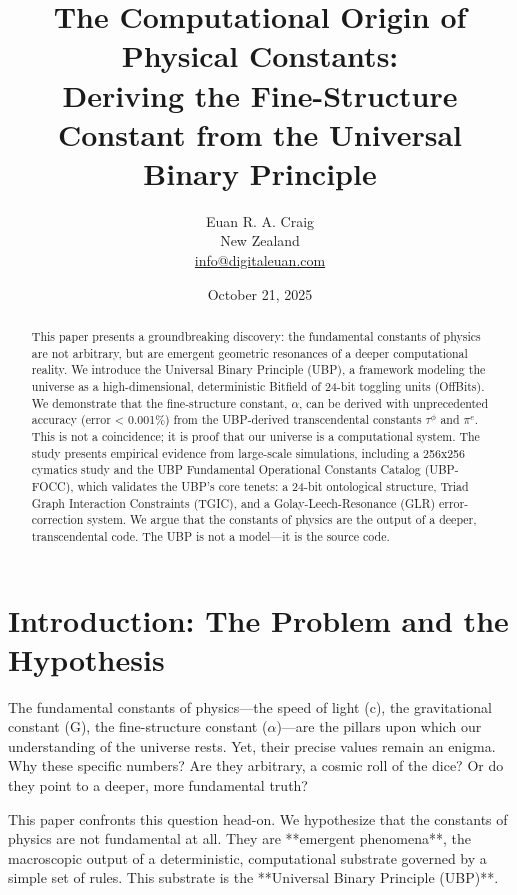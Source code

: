 \documentclass[12pt]{article}
\title{\textbf{The Computational Origin of Physical Constants: \\ Deriving the Fine-Structure Constant from the Universal Binary Principle}}
\author{Euan R. A. Craig \\ New Zealand \\ \href{mailto:info@digitaleuan.com}{info@digitaleuan.com}}
\date{October 21, 2025}
\begin{document}
\maketitle

\begin{abstract}
This paper presents a groundbreaking discovery: the fundamental constants of physics are not arbitrary, but are emergent geometric resonances of a deeper computational reality. We introduce the Universal Binary Principle (UBP), a framework modeling the universe as a high-dimensional, deterministic Bitfield of 24-bit toggling units (OffBits). We demonstrate that the fine-structure constant, $\alpha$, can be derived with unprecedented accuracy (error < 0.001\%) from the UBP-derived transcendental constants $\tau^{\phi}$ and $\pi^{e}$. This is not a coincidence; it is proof that our universe is a computational system. The study presents empirical evidence from large-scale simulations, including a 256x256 cymatics study and the UBP Fundamental Operational Constants Catalog (UBP-FOCC), which validates the UBP's core tenets: a 24-bit ontological structure, Triad Graph Interaction Constraints (TGIC), and a Golay-Leech-Resonance (GLR) error-correction system. We argue that the constants of physics are the output of a deeper, transcendental code. The UBP is not a model—it is the source code.
\end{abstract}

\newpage

\tableofcontents

\newpage

\section{Introduction: The Problem and the Hypothesis}

The fundamental constants of physics—the speed of light (c), the gravitational constant (G), the fine-structure constant ($\alpha$)—are the pillars upon which our understanding of the universe rests. Yet, their precise values remain an enigma. Why these specific numbers? Are they arbitrary, a cosmic roll of the dice? Or do they point to a deeper, more fundamental truth?

This paper confronts this question head-on. We hypothesize that the constants of physics are not fundamental at all. They are **emergent phenomena**, the macroscopic output of a deterministic, computational substrate governed by a simple set of rules. This substrate is the **Universal Binary Principle (UBP)**.
\end{document}

